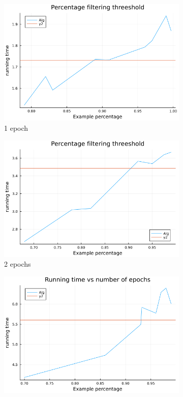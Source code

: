 \documentclass{article}
\begin{document}
\begin{figure}[htbp]
    \centering
    \begin{subfigure}[b]{0.3\textwidth}
        \includegraphics[width=\textwidth]{plot_threeshold1.png}
        \caption{1 epoch}
        \label{fig:threshold1}
    \end{subfigure}
    \hfill
    \begin{subfigure}[b]{0.3\textwidth}
        \includegraphics[width=\textwidth]{plot_threeshold2.png}
        \caption{2 epochs}
        \label{fig:threshold2}
    \end{subfigure}
    \hfill
    \begin{subfigure}[b]{0.3\textwidth}
        \includegraphics[width=\textwidth]{plot_threeshold3.png}

\end{subfigure}
\end{figure}
\end{document}
